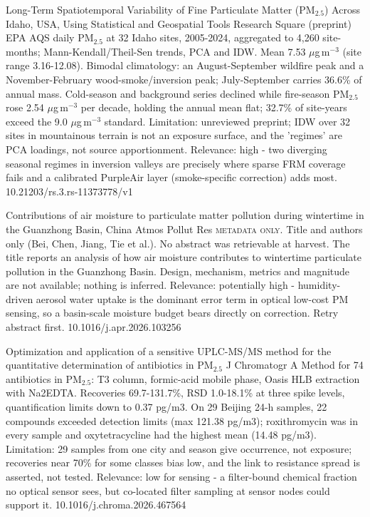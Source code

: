 \documentclass[10pt]{article}
\begin{document}
{Long-Term Spatiotemporal Variability of Fine Particulate Matter (PM$_{2.5}$) Across Idaho, USA, Using Statistical and Geospatial Tools}
{Research Square (preprint)}
{EPA AQS daily PM$_{2.5}$ at 32 Idaho sites, 2005-2024, aggregated to 4,260 site-months; Mann-Kendall/Theil-Sen trends, PCA and IDW. Mean 7.53 $\mu$g\,m$^{-3}$ (site range 3.16-12.08). Bimodal climatology: an August-September wildfire peak and a November-February wood-smoke/inversion peak; July-September carries 36.6\% of annual mass. Cold-season and background series declined while fire-season PM$_{2.5}$ rose 2.54 $\mu$g\,m$^{-3}$ per decade, holding the annual mean flat; 32.7\% of site-years exceed the 9.0 $\mu$g\,m$^{-3}$ standard. Limitation: unreviewed preprint; IDW over 32 sites in mountainous terrain is not an exposure surface, and the 'regimes' are PCA loadings, not source apportionment. Relevance: high - two diverging seasonal regimes in inversion valleys are precisely where sparse FRM coverage fails and a calibrated PurpleAir layer (smoke-specific correction) adds most.}
{10.21203/rs.3.rs-11373778/v1}

{Contributions of air moisture to particulate matter pollution during wintertime in the Guanzhong Basin, China}
{Atmos Pollut Res}
{\textsc{metadata only.} Title and authors only (Bei, Chen, Jiang, Tie et al.). No abstract was retrievable at harvest. The title reports an analysis of how air moisture contributes to wintertime particulate pollution in the Guanzhong Basin. Design, mechanism, metrics and magnitude are not available; nothing is inferred. Relevance: potentially high - humidity-driven aerosol water uptake is the dominant error term in optical low-cost PM sensing, so a basin-scale moisture budget bears directly on correction. Retry abstract first.}
{10.1016/j.apr.2026.103256}

\par{}\baselineskip{}\baselineskip
{}

{Optimization and application of a sensitive UPLC-MS/MS method for the quantitative determination of antibiotics in PM$_{2.5}$}
{J Chromatogr A}
{Method for 74 antibiotics in PM$_{2.5}$: T3 column, formic-acid mobile phase, Oasis HLB extraction with Na2EDTA. Recoveries 69.7-131.7\%, RSD 1.0-18.1\% at three spike levels, quantification limits down to 0.37 pg/m3. On 29 Beijing 24-h samples, 22 compounds exceeded detection limits (max 121.38 pg/m3); roxithromycin was in every sample and oxytetracycline had the highest mean (14.48 pg/m3). Limitation: 29 samples from one city and season give occurrence, not exposure; recoveries near 70\% for some classes bias low, and the link to resistance spread is asserted, not tested. Relevance: low for sensing - a filter-bound chemical fraction no optical sensor sees, but co-located filter sampling at sensor nodes could support it.}
{10.1016/j.chroma.2026.467564}
\end{document}
